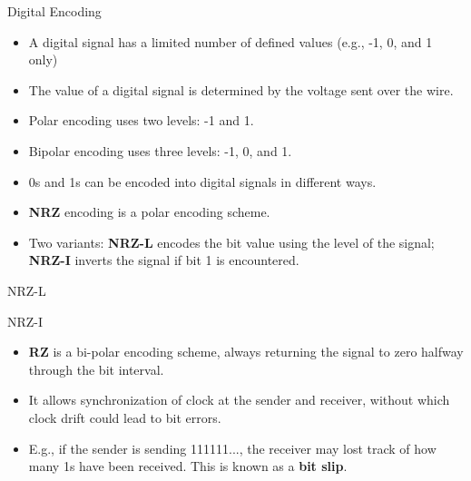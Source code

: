 \begin{cf}{
	Digital Encoding
}
\end{cf}

\begin{cf}{\small
	\begin{itemize}
	\item A digital signal has a limited number of defined values (e.g., -1, 0, and 1 only)
	\item The value of a digital signal is determined by the voltage sent over the wire.
	\item Polar encoding uses two levels: -1 and 1.
	\item Bipolar encoding uses three levels: -1, 0, and 1.
	\end{itemize}
}
\end{cf}

\begin{cf}{\small
	\begin{itemize}
	\item 0s and 1s can be encoded into digital signals in different ways.
	\item \textbf{NRZ} encoding is a polar encoding scheme.
	\item Two variants: \textbf{NRZ-L} encodes the bit value using the level of the signal;
	\textbf{NRZ-I} inverts the signal if bit 1 is encountered.
	\end{itemize}
}
\end{cf}

\begin{cf}{
	NRZ-L
	\vspace{1cm}

}
\end{cf}

\begin{cf}{
	NRZ-I
	\vspace{1cm}

}
\end{cf}

\begin{cf}{\small
	\begin{itemize}
	\item \textbf{RZ} is a bi-polar encoding scheme, always returning the signal to zero halfway through the bit interval.
	\item It allows synchronization of clock at the sender and receiver, without which clock drift could lead to bit errors.
	\item E.g., if the sender is sending 111111..., the receiver may lost track of how many 1s have been received.  This is known as a \textbf{bit slip}.
	\end{itemize}
}
\end{cf}

